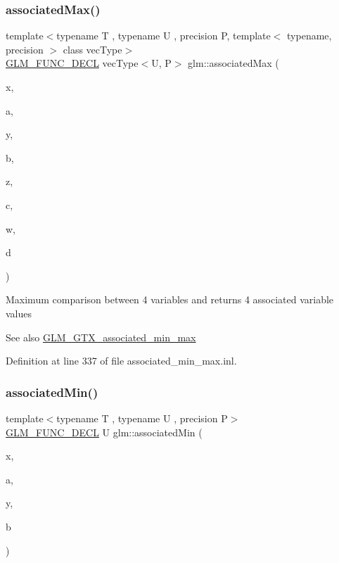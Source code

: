 \subsubsection{\texorpdfstring{associatedMax()}{associatedMax()}\hspace{0.1cm}{\footnotesize\ttfamily [12/12]}}
{\footnotesize\ttfamily template$<$typename T , typename U , precision P, template$<$ typename, precision $>$ class vec\+Type$>$ \\
\mbox{\hyperlink{setup_8hpp_ab2d052de21a70539923e9bcbf6e83a51}{G\+L\+M\+\_\+\+F\+U\+N\+C\+\_\+\+D\+E\+CL}} vec\+Type$<$U, P$>$ glm\+::associated\+Max (\begin{DoxyParamCaption}\item[{vec\+Type$<$ T, P $>$ const \&}]{x,  }\item[{U}]{a,  }\item[{vec\+Type$<$ T, P $>$ const \&}]{y,  }\item[{U}]{b,  }\item[{vec\+Type$<$ T, P $>$ const \&}]{z,  }\item[{U}]{c,  }\item[{vec\+Type$<$ T, P $>$ const \&}]{w,  }\item[{U}]{d }\end{DoxyParamCaption})}

Maximum comparison between 4 variables and returns 4 associated variable values \begin{DoxySeeAlso}{See also}
\mbox{\hyperlink{group__gtx__associated__min__max}{G\+L\+M\+\_\+\+G\+T\+X\+\_\+associated\+\_\+min\+\_\+max}} 
\end{DoxySeeAlso}


Definition at line 337 of file associated\+\_\+min\+\_\+max.\+inl.

\mbox{\label{group__gtx__associated__min__max_gacc01bd272359572fc28437ae214a02df}} 
\subsubsection{\texorpdfstring{associatedMin()}{associatedMin()}\hspace{0.1cm}{\footnotesize\ttfamily [1/10]}}
{\footnotesize\ttfamily template$<$typename T , typename U , precision P$>$ \\
\mbox{\hyperlink{setup_8hpp_ab2d052de21a70539923e9bcbf6e83a51}{G\+L\+M\+\_\+\+F\+U\+N\+C\+\_\+\+D\+E\+CL}} U glm\+::associated\+Min (\begin{DoxyParamCaption}\item[{T}]{x,  }\item[{U}]{a,  }\item[{T}]{y,  }\item[{U}]{b }\end{DoxyParamCaption})}

